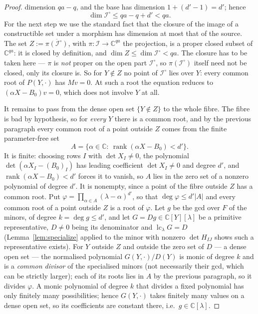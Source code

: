 \documentclass[journal]{IEEEtran}
\theoremstyle{plainn}
\theoremstyle{remark}
\begin{document}
\begin{proof}
dimension $qa-q$, and the base has dimension $1+(d'-1)=d'$; hence
\begin{equation}\label{eq:dimI}
\dim\mathcal I^{\circ}\le qa-q+d'<qa .
\end{equation}
For the next step we use the standard fact that the closure of the image of a constructible set under a
morphism has dimension at most that of the source. The set
$Z:=\overline{\pi(\mathcal I^{\circ})}$, with $\pi:\mathcal I\to\mathbb C^{qa}$ the projection, is a
proper closed subset of $\mathbb C^{qa}$: it is closed by definition, and $\dim Z\le\dim\mathcal
I^{\circ}<qa$. The closure has to be taken here --- $\pi$ is \emph{not} proper on the open part
$\mathcal I^{\circ}$, so $\pi(\mathcal I^{\circ})$ itself need not be closed, only its closure is. So for
$Y\notin Z$ no point of $\mathcal I^{\circ}$ lies over $Y$: every common root of $P(Y,\cdot)$ has
$Mv=0$. At such a root the equation reduces to $(\alpha X-B_0)v=0$, which does not involve $Y$ at
all.

It remains to pass from the dense open set $\{Y\notin Z\}$ to the whole fibre. The fibre is bad by
hypothesis, so for \emph{every} $Y$ there is a common root, and by the previous paragraph every common
root of a point outside $Z$ comes from the finite parameter-free set
$$A=\{\alpha\in\mathbb C:\ \operatorname{rank}(\alpha X-B_0)<d'\}.$$
It is finite: choosing rows $I$ with $\det X_I\ne0$, the polynomial $\det(\alpha X_I-(B_0)_I)$ has leading
coefficient $\det X_I\ne0$ and degree $d'$, and $\operatorname{rank}(\alpha X-B_0)<d'$ forces it to vanish,
so $A$ lies in the zero set of a nonzero polynomial of degree $d'$. It is nonempty, since a point of the
fibre outside $Z$ has a common root. Put
$\varphi=\prod_{\alpha\in A}(\lambda-\alpha)^{d'}$, so that $\deg\varphi\le d'|A|$ and every common
root of a point outside $Z$ is a root of $\varphi$. Let $g$ be the gcd over $F$ of the minors, of degree
$k=\deg g\le d'$, and let $G=Dg\in\mathbb C[Y][\lambda]$ be a primitive representative, $D\ne0$ being its
denominator and $\operatorname{lc}_\lambda G=D$ (Lemma~\ref{lem:specialize} applied to the minor with
nonzero $\det H_{IJ}$ shows such a representative exists). For $Y$ outside $Z$ and outside the zero set
of $D$ --- a dense open set --- the normalised polynomial $G(Y,\cdot)/D(Y)$ is monic of degree $k$ and is a
\emph{common divisor} of the specialised minors (not necessarily their gcd, which can be strictly larger);
each of its roots lies in $A$ by the previous paragraph, so it divides $\varphi$. A monic polynomial of
degree $k$ that divides a fixed polynomial has only finitely many possibilities; hence $G(Y,\cdot)$
takes finitely many values on a dense open set, so its coefficients are constant there, i.e.\ $g\in\mathbb
C[\lambda]$.


\end{proof}
\end{document}
